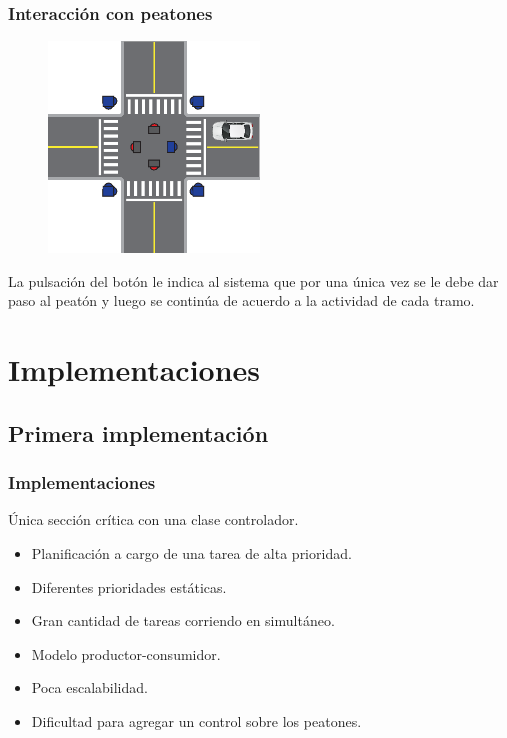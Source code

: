 \begin{frame}
\frametitle{Interacción con peatones}
\begin{figure}[htbp]
	\centering
	\includegraphics[width=0.50\textwidth]{diagramas/peaton-auto.eps}
\end{figure}
La pulsación del botón le indica al sistema que por una única vez se le debe dar paso al peatón y luego se continúa de acuerdo a la actividad de cada tramo.
\end{frame}

\section{Implementaciones}

\subsection{Primera implementación}

\begin{frame}
\frametitle{Implementaciones}
\begin{block}{Única sección crítica con una clase controlador.}
	\begin{itemize}
		\item Planificación a cargo de una tarea de alta prioridad.
		\item Diferentes prioridades estáticas.
		\item Gran cantidad de tareas corriendo en simultáneo.
		\item Modelo productor-consumidor.
		\item Poca escalabilidad.
		\item Dificultad para agregar un control sobre los peatones.
	\end{itemize}
\end{block}
\end{frame}

